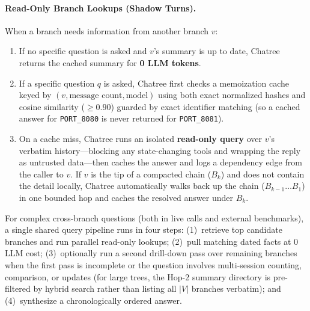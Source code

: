 \documentclass[10pt,twocolumn]{article}
\begin{document}
\paragraph{Read-Only Branch Lookups (Shadow Turns).}
When a branch needs information from another branch $v$:
\begin{enumerate}
  \item If no specific question is asked and $v$'s summary is up to date, Chatree returns the cached summary for \textbf{0 LLM tokens}.
  \item If a specific question $q$ is asked, Chatree first checks a memoization cache keyed by $(v, \text{message count}, \text{model})$ using both exact normalized hashes and cosine similarity ($\ge 0.90$) guarded by exact identifier matching (so a cached answer for \texttt{PORT\_8080} is never returned for \texttt{PORT\_8081}).
  \item On a cache miss, Chatree runs an isolated \textbf{read-only query} over $v$'s verbatim history—blocking any state-changing tools and wrapping the reply as untrusted data—then caches the answer and logs a dependency edge from the caller to $v$. If $v$ is the tip of a compacted chain ($B_k$) and does not contain the detail locally, Chatree automatically walks back up the chain ($B_{k-1} \dots B_1$) in one bounded hop and caches the resolved answer under $B_k$.
\end{enumerate}

For complex cross-branch questions (both in live calls and external benchmarks), a single shared query pipeline runs in four steps: (1)~retrieve top candidate branches and run parallel read-only lookups; (2)~pull matching dated facts at 0 LLM cost; (3)~optionally run a second drill-down pass over remaining branches when the first pass is incomplete or the question involves multi-session counting, comparison, or updates (for large trees, the Hop-2 summary directory is pre-filtered by hybrid search rather than listing all $|V|$ branches verbatim); and (4)~synthesize a chronologically ordered answer.
\end{document}
